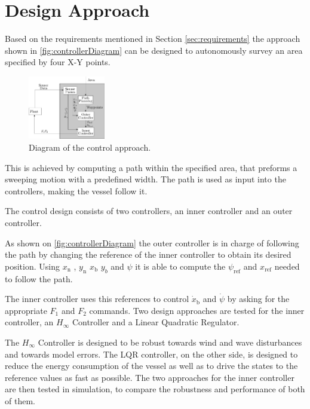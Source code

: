 \chapter{Design Approach} \label{chap:designaproach}
Based on the requirements mentioned in Section \ref{sec:requirements} the approach shown in \autoref{fig:controllerDiagram} can be designed to autonomously survey an area specified by four X-Y points.
\begin{figure}[H]
    \includegraphics[width=0.3\textwidth]{figures/controllerDiagram2}
    \caption{Diagram of the control approach.}
    \label{fig:controllerDiagram}
\end{figure}
This is achieved by computing a path within the specified area, that preforms a sweeping motion with a predefined width. The path is used as input into the controllers, making the vessel follow it. 

The control design consists of two controllers, an inner controller and an outer controller. 

As shown on \autoref{fig:controllerDiagram} the outer controller is in charge of following the path by changing the reference of the inner controller to obtain its desired position. Using $x_\mathrm{n}$ , $y_\mathrm{n}$ $x_\mathrm{b}$ $y_b$ and $\psi$ it is able to compute the $\psi_\mathrm{ref}$ and $x_\mathrm{ref}$ needed to follow the path. 

The inner controller uses this references to control $\dot{x}_\mathrm{b}$ and $\dot{\psi}$ by asking for the appropriate $F_{1}$ and $F_{2}$ commands. Two design approaches are tested for the inner controller, an $H_{\infty}$ Controller and a Linear Quadratic Regulator.

The $H_{\infty}$ Controller is designed to be robust towards wind and wave disturbances and towards model errors. The LQR controller, on the other side, is designed to reduce the energy consumption of the vessel as well as to drive the states to the reference values as fast as possible. 
The two approaches for the inner controller are then tested in simulation, to compare the robustness and performance of both of them. 

